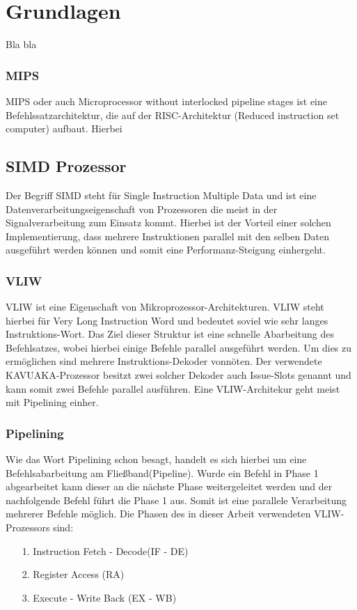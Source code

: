 \chapter{Grundlagen}
\label{chap:grundlagen}

Bla bla
\subsection{MIPS}
MIPS oder auch \glqq Microprocessor without interlocked pipeline stages\grqq{} ist eine Befehlssatzarchitektur, die auf der RISC-Architektur  (Reduced instruction set computer) aufbaut. Hierbei

\section{SIMD Prozessor}
\label{sec:VLIW}
Der Begriff SIMD steht für Single Instruction Multiple Data und ist eine Datenverarbeitungseigenschaft von Prozessoren die meist in der Signalverarbeitung zum Einsatz kommt. Hierbei ist der Vorteil einer solchen Implementierung, dass mehrere Instruktionen parallel mit den selben Daten ausgeführt werden können und somit eine Performanz-Steigung einhergeht.

\subsection{VLIW}
VLIW ist eine Eigenschaft von Mikroprozessor-Architekturen. VLIW steht hierbei für Very Long Instruction Word und bedeutet soviel wie sehr langes Instruktions-Wort. Das Ziel dieser Struktur ist eine schnelle Abarbeitung des Befehlsatzes, wobei hierbei einige Befehle parallel ausgeführt werden. Um dies zu ermöglichen sind mehrere Instruktions-Dekoder vonnöten. Der verwendete KAVUAKA-Prozessor besitzt zwei solcher Dekoder auch Issue-Slots genannt und kann somit zwei Befehle parallel ausführen. Eine VLIW-Architekur geht meist mit Pipelining einher. 
\subsection{Pipelining}
Wie das Wort Pipelining schon besagt, handelt es sich hierbei um eine Befehlsabarbeitung am Fließband(Pipeline). Wurde ein Befehl in Phase 1 abgearbeitet kann dieser an die nächste Phase weitergeleitet werden und der nachfolgende Befehl führt die Phase 1 aus. Somit ist eine parallele Verarbeitung mehrerer Befehle möglich. Die Phasen des in dieser Arbeit verwendeten VLIW-Prozessors sind: 
\begin{itemize}
	\item[1.] Instruction Fetch - Decode(IF - DE) 
	\item[2.] Register Access (RA)
	\item[3.] Execute - Write Back (EX - WB)
\end{itemize}

